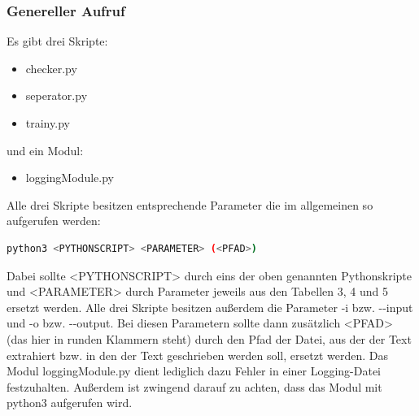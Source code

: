 \documentclass[12pt]{scrartcl}
\begin{document}
\subsubsection{Genereller Aufruf}
\label{sec:first-steps-general}
Es gibt drei Skripte: \begin{itemize}
\item checker.py
\item seperator.py
\item trainy.py
\end{itemize}
und ein Modul:
\begin{itemize}
\item loggingModule.py
\end{itemize}
Alle drei Skripte besitzen entsprechende Parameter die im allgemeinen so aufgerufen werden:
\begin{lstlisting}[language=bash]
python3 <PYTHONSCRIPT> <PARAMETER> (<PFAD>) 
\end{lstlisting}
Dabei sollte <PYTHONSCRIPT> durch eins der oben genannten Pythonskripte und <PARAMETER> durch Parameter jeweils aus den Tabellen 3, 4 und 5 ersetzt werden. Alle drei Skripte besitzen außerdem die Parameter -i bzw. -{}-input und -o bzw. -{}-output. Bei  diesen Parametern sollte dann zusätzlich <PFAD> (das hier in runden Klammern steht) durch den Pfad der Datei, aus der der Text extrahiert bzw. in den der Text geschrieben werden soll, ersetzt werden. 
Das Modul loggingModule.py dient lediglich dazu Fehler in einer Logging-Datei festzuhalten. 
Außerdem ist zwingend darauf zu achten, dass das Modul mit python3 aufgerufen wird.
\end{document}
